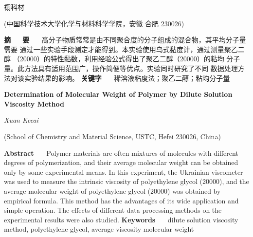 \documentclass[12pt]{ctexart}
\numberwithin{equation}{section}
\begin{document}
\nocite{*}

\begin{center}
    \heiti {}

    \vspace{12pt}

    \kaishu \fontsize{13.75pt}{0}禤科材


    \vspace{5pt}

    \songti \fontsize{12pt}{0}(中国科学技术大学化学与材料科学学院，安徽 合肥 230026)
\end{center}

\noindent\textbf{摘~~~\!要}~~~\!
高分子物质常常是由不同聚合度的分子组成的混合物，其平均分子量需要
通过一些实验手段测定才能得到。本实验使用乌式黏度计，通过测量聚乙二醇
（20000）的特性黏数，利用经验公式得出了聚乙二醇（20000）的粘均
分子量。此方法具有适用范围广，操作简便等优点。实验同时研究了不同
数据处理方法对该实验结果的影响。
\newline
\textbf{关键字}~~~\!
稀溶液粘度法；聚乙二醇；粘均分子量

\begin{center}
    {\LARGE\rmfamily\textbf{Determination of Molecular Weight of Polymer by Dilute Solution Viscosity Method}}

    \vspace{12pt}

    {\slshape Xuan Kecai}

    \vspace{5pt}

    (School of Chemistry and Material Science, USTC, Hefei 230026, China)
\end{center}

\noindent\textbf{Abstract}~~~\!
Polymer materials are often mixtures of molecules with
different degrees of polymerization, and their average
molecular weight can be obtained only by some experimental
means. In this experiment, the Ukrainian viscometer was used
to measure the intrinsic viscosity of polyethylene glycol
(20000), and the average molecular weight of polyethylene
glycol (20000) was obtained by empirical formula. This method
has the advantages of its wide application and simple
operation. The effects of different data processing methods
on the experimental results were also studied.
\newline
\textbf{Keywords}~~~\!
dilute solution viscosity method, polyethylene glycol,
average viscosity molecular weight
\end{document}
